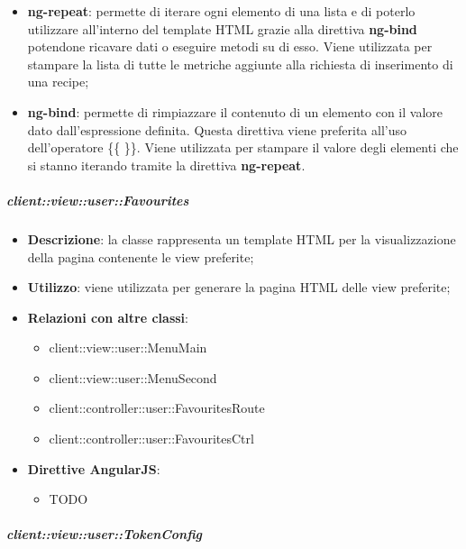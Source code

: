 \begin{itemize}
\begin{itemize}
						\item \textbf{ng-repeat}: permette di iterare ogni elemento di una lista e di poterlo utilizzare all'interno del template HTML grazie alla direttiva \textbf{ng-bind} potendone ricavare dati o eseguire metodi su di esso. Viene utilizzata per stampare la lista di tutte le metriche aggiunte alla richiesta di inserimento di una recipe;
						\item \textbf{ng-bind}: permette di rimpiazzare il contenuto di un elemento con il valore dato dall'espressione definita. Questa direttiva viene preferita all'uso dell'operatore \{\{ \}\}. Viene utilizzata per stampare il valore degli elementi che si stanno iterando tramite la direttiva \textbf{ng-repeat}.
					\end{itemize}
			\end{itemize}

		\subparagraph{client::view::user::Favourites} %
		\label{subp:bdsm_app_client_view_user_favourites}

			\begin{itemize}
				\item \textbf{Descrizione}: la classe rappresenta un template HTML per la visualizzazione della pagina contenente le view preferite;
				\item \textbf{Utilizzo}: viene utilizzata per generare la pagina HTML delle view preferite;
				\item \textbf{Relazioni con altre classi}:
					\begin{itemize}
						\item client::view::user::MenuMain
						\item client::view::user::MenuSecond
						\item client::controller::user::FavouritesRoute
						\item client::controller::user::FavouritesCtrl
					\end{itemize}
				\item \textbf{Direttive AngularJS}:
					\begin{itemize}
						\item TODO
					\end{itemize}
			\end{itemize}

		\subparagraph{client::view::user::TokenConfig} %
		\label{subp:bdsm_app_client_view_user_tokenconfig}

